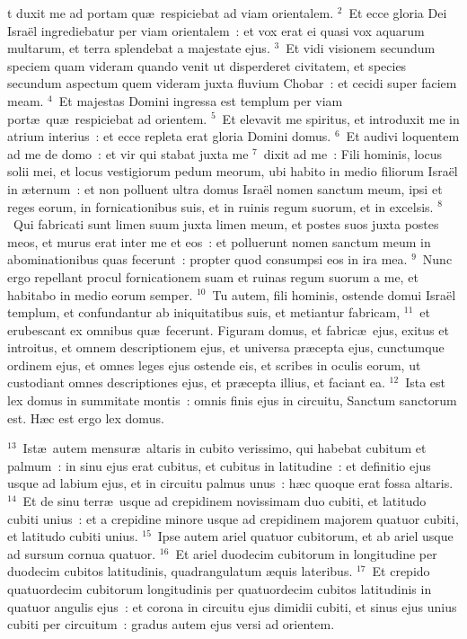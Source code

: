 \bchapter
{}t duxit me ad portam qu\ae\ respiciebat ad viam orientalem.
${}^{2}$~Et ecce gloria Dei Isra\"el ingrediebatur per viam orientalem~: et vox erat ei quasi vox aquarum multarum, et terra splendebat a majestate ejus.
${}^{3}$~Et vidi visionem secundum speciem quam videram quando venit ut disperderet civitatem, et species secundum aspectum quem videram juxta fluvium Chobar~: et cecidi super faciem meam.
${}^{4}$~Et majestas Domini ingressa est templum per viam port\ae\ qu\ae\ respiciebat ad orientem.
${}^{5}$~Et elevavit me spiritus, et introduxit me in atrium interius~: et ecce repleta erat gloria Domini domus.
${}^{6}$~Et audivi loquentem ad me de domo~: et vir qui stabat juxta me
${}^{7}$~dixit ad me~: Fili hominis, locus solii mei, et locus vestigiorum pedum meorum, ubi habito in medio filiorum Isra\"el in \ae ternum~: et non polluent ultra domus Isra\"el nomen sanctum meum, ipsi et reges eorum, in fornicationibus suis, et in ruinis regum suorum, et in excelsis.
${}^{8}$~Qui fabricati sunt limen suum juxta limen meum, et postes suos juxta postes meos, et murus erat inter me et eos~: et polluerunt nomen sanctum meum in abominationibus quas fecerunt~: propter quod consumpsi eos in ira mea.
${}^{9}$~Nunc ergo repellant procul fornicationem suam et ruinas regum suorum a me, et habitabo in medio eorum semper.
${}^{10}$~Tu autem, fili hominis, ostende domui Isra\"el templum, et confundantur ab iniquitatibus suis, et metiantur fabricam,
${}^{11}$~et erubescant ex omnibus qu\ae\ fecerunt. Figuram domus, et fabric\ae\ ejus, exitus et introitus, et omnem descriptionem ejus, et universa pr\ae cepta ejus, cunctumque ordinem ejus, et omnes leges ejus ostende eis, et scribes in oculis eorum, ut custodiant omnes descriptiones ejus, et pr\ae cepta illius, et faciant ea.
${}^{12}$~Ista est lex domus in summitate montis~: omnis finis ejus in circuitu, Sanctum sanctorum est. H\ae c est ergo lex domus.


${}^{13}$~Ist\ae\ autem mensur\ae\ altaris in cubito verissimo, qui habebat cubitum et palmum~: in sinu ejus erat cubitus, et cubitus in latitudine~: et definitio ejus usque ad labium ejus, et in circuitu palmus unus~: h\ae c quoque erat fossa altaris.
${}^{14}$~Et de sinu terr\ae\ usque ad crepidinem novissimam duo cubiti, et latitudo cubiti unius~: et a crepidine minore usque ad crepidinem majorem quatuor cubiti, et latitudo cubiti unius.
${}^{15}$~Ipse autem ariel quatuor cubitorum, et ab ariel usque ad sursum cornua quatuor.
${}^{16}$~Et ariel duodecim cubitorum in longitudine per duodecim cubitos latitudinis, quadrangulatum \ae quis lateribus.
${}^{17}$~Et crepido quatuordecim cubitorum longitudinis per quatuordecim cubitos latitudinis in quatuor angulis ejus~: et corona in circuitu ejus dimidii cubiti, et sinus ejus unius cubiti per circuitum~: gradus autem ejus versi ad orientem.


